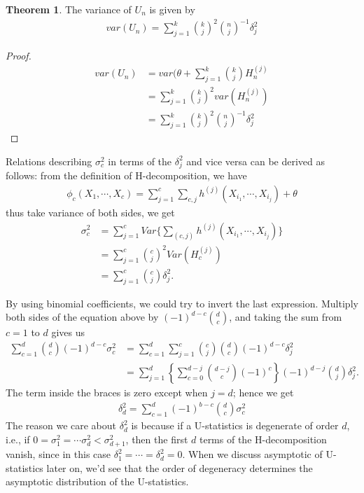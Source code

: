 \documentclass{article}
\theoremstyle{definition}
\newtheorem{theorem}{Theorem}
\numberwithin{Def}{section}
\begin{document}
\begin{itemize}
    
    \begin{theorem}
    The variance of $U_n$ is given by 
    \begin{align}
        var(U_n) = \sum_{j=1}^k {k \choose j}^2 {n \choose j}^{-1}\delta_j^2
    \end{align}
    \end{theorem}
    \begin{proof}
    \begin{align*}
        var(U_n) &= var(\theta + \sum_{j=1}^k {k \choose j}H_n^{(j)} \\
        &= \sum_{j=1}^k {k \choose j}^2var(H_n^{(j)})\\
        &= \sum_{j=1}^k {k \choose j}^2 {n \choose j}^{-1}\delta_j^2
    \end{align*}
    \end{proof}
    \end{itemize}
    Relations describing $\sigma_{c}^2$ in terms of the $\delta_j^2 $ and vice versa can be derived as follows: from the definition of H-decomposition, we have 
    \begin{align*}
        \phi_c (X_1, \cdots, X_c) = \sum_{j = 1}^c \sum_{c,j} h^{(j)} (X_{i_{1}}, \cdots , X_{i_j}) + \theta
    \end{align*}
    thus take variance of both sides, we get 
    \begin{align*}
        \sigma_{c}^2 &= \sum_{j = 1}^c Var\{ \sum_{(c, j)} h^{(j)} (X_{i_{1}}, \cdots , X_{i_j})\} \\
        &= \sum_{j = 1}^c {c \choose j}^2 Var( H_c^{(j)}) \\ 
        &= \sum_{j = 1}^c {c \choose j} \delta_j^2.
    \end{align*}
    
    By using binomial coefficients, we could try to invert the last expression. Multiply both sides of the equation above by  $(-1)^{d-c} {d \choose c}$, and taking the sum from $c = 1$ to $d$ gives us
    \begin{align*}
        \sum_{c=1}^d {d \choose c} (-1)^{d-c} \sigma_{c}^2 &= \sum_{c=1}^d  
       \sum_{j = 1}^c {c \choose j}  {d \choose c} (-1)^{d-c} \delta_j^2 \\
       &= \sum_{j=1}^d \left\{ \sum_{c = 0}^{d - j} {d - j \choose c} (-1)^c \right\} (-1)^{d -j} {d \choose j} \delta_j^2.
    \end{align*}
    The term inside the braces is zero except when $j = d$; hence we get 
    \begin{align*}
        \delta_d^2 = \sum_{c = 1}^d (-1)^{b-c} {d \choose c} \sigma_{c}^2
    \end{align*}
    The reason we care about $\delta_d^2$ is because if a U-statistics is degenerate of order $d$, i.e., if $0 = \sigma_1^2 = \cdots \sigma_d^2 < \sigma_{d+1}^2$, then the first $d$ terms of the H-decomposition vanish, since in this case $\delta_1^2 = \cdots = \delta_d^2 = 0.$ When we discuss asymptotic of U-statistics later on, we'd see that the order of degeneracy determines the asymptotic distribution of the U-statistics.  
    
\end{document}
